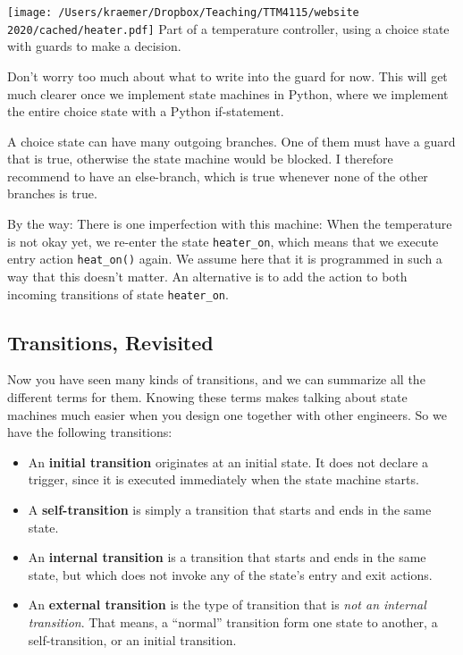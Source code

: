 \documentclass[10pt, twoside, twocolumn]{book}
\providecommand{\tightlist}{%
  \setlength{\itemsep}{0pt}\setlength{\parskip}{0pt}}
\renewcommand{\caption}{}
\let\origfigure=\figure
\let\endorigfigure=\endfigure
\renewenvironment{figure}[1][]{%
  \origfigure[H]
}{%
  \endorigfigure
}
\begin{document}
\begin{figure}[htbp]
\begin{center}
\texttt{[image: /Users/kraemer/Dropbox/Teaching/TTM4115/website 2020/cached/heater.pdf]}%
\caption{Part of a temperature controller, using a choice state with guards to
make a decision.}
\label{default}
\end{center}
\end{figure}
Don't worry too much about what to write into the guard for now. This
will get much clearer once we implement state machines in Python, where
we implement the entire choice state with a Python if-statement.

A choice state can have many outgoing branches. One of them must have a
guard that is true, otherwise the state machine would be blocked. I
therefore recommend to have an else-branch, which is true whenever none
of the other branches is true.

By the way: There is one imperfection with this machine: When the
temperature is not okay yet, we re-enter the state \texttt{heater\_on},
which means that we execute entry action \texttt{heat\_on()} again. We
assume here that it is programmed in such a way that this doesn't
matter. An alternative is to add the action to both incoming transitions
of state \texttt{heater\_on}.

\hypertarget{transitions-revisited}{%
\subsection{Transitions, Revisited}\label{transitions-revisited}}

Now you have seen many kinds of transitions, and we can summarize all
the different terms for them. Knowing these terms makes talking about
state machines much easier when you design one together with other
engineers. So we have the following transitions:

\begin{itemize}
\tightlist
\item
  An \textbf{initial transition} originates at an initial state. It does
  not declare a trigger, since it is executed immediately when the state
  machine starts.
\item
  A \textbf{self-transition} is simply a transition that starts and ends
  in the same state.
\item
  An \textbf{internal transition} is a transition that starts and ends
  in the same state, but which does not invoke any of the state's entry
  and exit actions.
\item
  An \textbf{external transition} is the type of transition that is
  \emph{not an internal transition}. That means, a ``normal'' transition
  form one state to another, a self-transition, or an initial
  transition.
\end{itemize}
\end{document}
